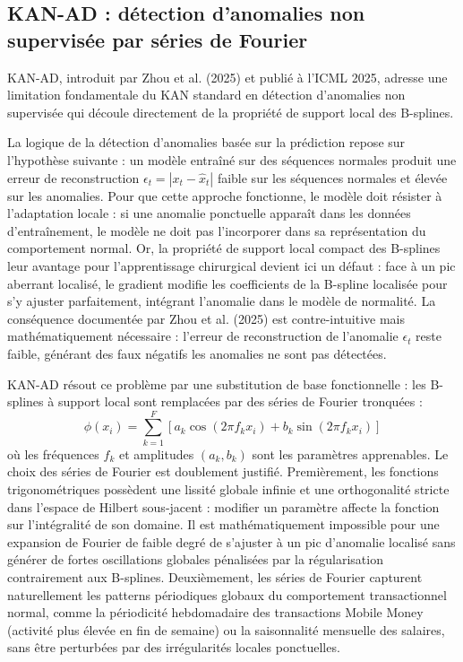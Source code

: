 \documentclass[11pt,a4paper,oneside]{report}
\theoremstyle{definition}
\theoremstyle{remark}
\begin{document}
\subsection{KAN-AD : détection d'anomalies non supervisée par séries de Fourier}

KAN-AD, introduit par Zhou et al. (2025) et publié à l'ICML 2025, adresse une limitation fondamentale du KAN standard en détection d'anomalies non supervisée qui découle directement de la propriété de support local des B-splines.

La logique de la détection d'anomalies basée sur la prédiction repose sur l'hypothèse suivante : un modèle entraîné sur des séquences normales produit une erreur de reconstruction $\epsilon_t = |x_t - \hat{x}_t|$ faible sur les séquences normales et élevée sur les anomalies. Pour que cette approche fonctionne, le modèle doit résister à l'adaptation locale : si une anomalie ponctuelle apparaît dans les données d'entraînement, le modèle ne doit pas l'incorporer dans sa représentation du comportement normal. Or, la propriété de support local compact des B-splines  leur avantage pour l'apprentissage chirurgical  devient ici un défaut : face à un pic aberrant localisé, le gradient modifie les coefficients de la B-spline localisée pour s'y ajuster parfaitement, intégrant l'anomalie dans le modèle de normalité. La conséquence documentée par Zhou et al. (2025) est contre-intuitive mais mathématiquement nécessaire : l'erreur de reconstruction de l'anomalie $\epsilon_t$ reste faible, générant des faux négatifs  les anomalies ne sont pas détectées.

KAN-AD résout ce problème par une substitution de base fonctionnelle : les B-splines à support local sont remplacées par des séries de Fourier tronquées :
\begin{equation}
\phi(x_i) = \sum_{k=1}^{F} \left[a_k \cos(2\pi f_k x_i) + b_k \sin(2\pi f_k x_i)\right]
\end{equation}
où les fréquences $f_k$ et amplitudes $(a_k, b_k)$ sont les paramètres apprenables. Le choix des séries de Fourier est doublement justifié. Premièrement, les fonctions trigonométriques possèdent une lissité globale infinie et une orthogonalité stricte dans l'espace de Hilbert sous-jacent : modifier un paramètre affecte la fonction sur l'intégralité de son domaine. Il est mathématiquement impossible pour une expansion de Fourier de faible degré de s'ajuster à un pic d'anomalie localisé sans générer de fortes oscillations globales pénalisées par la régularisation  contrairement aux B-splines. Deuxièmement, les séries de Fourier capturent naturellement les patterns périodiques globaux du comportement transactionnel normal, comme la périodicité hebdomadaire des transactions Mobile Money (activité plus élevée en fin de semaine) ou la saisonnalité mensuelle des salaires, sans être perturbées par des irrégularités locales ponctuelles.
\end{document}
